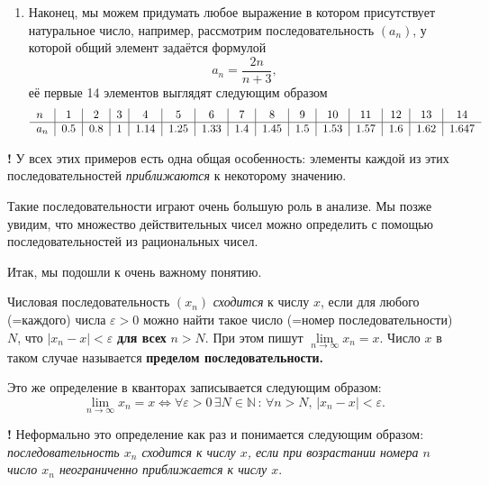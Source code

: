 \begin{example}
\begin{enumerate}
    \item Наконец, мы можем придумать любое выражение в котором присутствует натуральное число, например, рассмотрим последовательность $(a_n)$, у которой общий элемент задаётся формулой
    \[
     a_n = \frac{2n}{n+3},
    \]
    её первые 14 элементов выглядят следующим образом
    \[
       \begin{tabular}{l|c|c|c|c|c|c|c|c|c|c|c|c|c|c}
             $n$ & 1&2&3&4&5&6&7&8&9&10&11&12&13&14  \\
             \hline
             $a_n$&  0.5 & 0.8 & 1 & 1.14 & 1.25 & 1.33& 1.4 & 1.45 & 1.5 & 1.53 & 1.57 & 1.6 & 1.62 & 1.647 
         \end{tabular}
        \]
    \end{enumerate}
\end{example}

\begin{mydanger}{\bf {\color{red}!}}
 У всех этих примеров есть одна общая особенность: {\color{red}элементы каждой из этих последовательностей \textit{приближаются} к некоторому значению.}     
\end{mydanger}

\begin{remark}
 Такие последовательности играют очень большую роль в анализе. Мы позже увидим, что множество действительных чисел можно определить с помощью последовательностей из рациональных чисел.    
\end{remark}

Итак, мы подошли к очень важному понятию.

\begin{definition}\label{limit_of_seqeunce}
    Числовая последовательность $(x_n)$ \textit{сходится} к числу $x$, если для любого (=каждого) числа $\varepsilon>0$ можно найти такое число (=номер последовательности) $N$, что $|x_n -x|<\varepsilon$ {\color{red} \bf для всех} $n >N$. При этом пишут $\lim\limits_{n \to \infty} x_n = x$. Число $x$ в таком случае называется \textbf{пределом последовательности.}
\end{definition}

Это же определение в кванторах записывается следующим образом: 
\[
 \boxed{
\lim_{n \to \infty } x_n = x \Longleftrightarrow  \forall \varepsilon >0\, \exists N \in \mathbb{N}\, :\, \forall n >N, \, |x_n - x| <\varepsilon.
}
\]

\begin{mydanger}{\bf{!}}
Неформально это определение как раз и понимается следующим образом: \textit{последовательность $x_n$ сходится к числу $x$, если при возрастании номера $n$ число $x_n$ неограниченно приближается к числу $x.$}
\end{mydanger}

